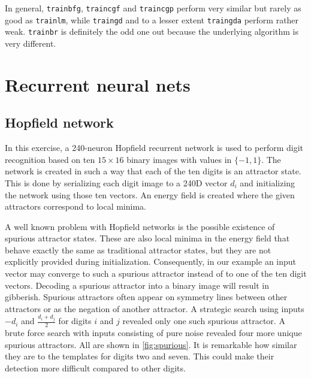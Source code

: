 \documentclass[a4, 10pt, twoside, twocolumn]{article}
\numberwithin{figure}{section}
\begin{document}
In general, \texttt{trainbfg}, \texttt{traincgf} and \texttt{traincgp} perform very similar but rarely as good as \texttt{trainlm}, while \texttt{traingd} and to a lesser extent \texttt{traingda} perform rather weak. \texttt{trainbr} is definitely the odd one out because the underlying algorithm is very different.


\section{Recurrent neural nets}

\subsection{Hopfield network}
\label{ssec:hopfield}
In this exercise, a 240-neuron Hopfield recurrent network is used to perform digit recognition based on ten $15 \times 16$ binary images with values in $\{-1, 1\}$. The network is created in such a way that each of the ten digits is an attractor state. This is done by serializing each digit image to a 240D vector $d_i$ and initializing the network using those ten vectors. An energy field is created where the given attractors correspond to local minima.

A well known problem with Hopfield networks is the possible existence of spurious attractor states. These are also local minima in the energy field that behave exactly the same as traditional attractor states, but they are not explicitly provided during initialization. Consequently, in our example an input vector may converge to such a spurious attractor instead of to one of the ten digit vectors. Decoding a spurious attractor into a binary image will result in gibberish. Spurious attractors often appear on symmetry lines between other attractors or as the negation of another attractor. A strategic search using inputs $-d_i$ and $\frac{d_i + d_j}{2}$ for digits $i$ and $j$ revealed only one such spurious attractor. A brute force search with inputs consisting of pure noise revealed four more unique spurious attractors. All are shown in \autoref{fig:spurious}. It is remarkable how similar they are to the templates for digits two and seven. This could make their detection more difficult compared to other digits.
\end{document}
